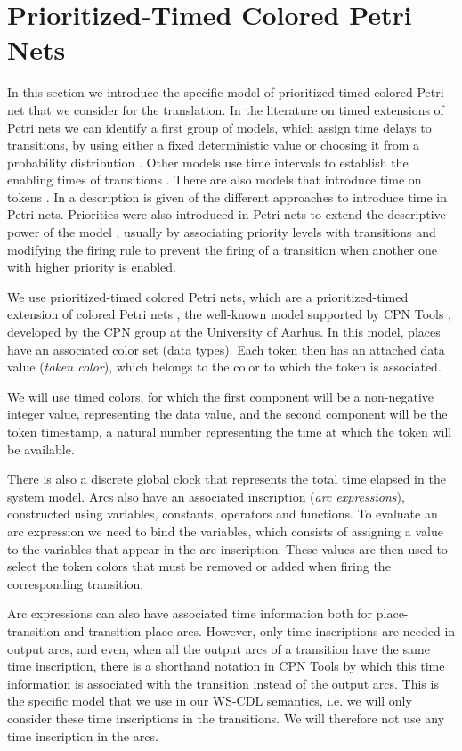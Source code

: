 \section{Prioritized-Timed Colored Petri Nets}\label{petrinet}

In this section we introduce the specific model of prioritized-timed
colored Petri net that we consider for the translation. 
In the
literature on timed extensions of Petri nets we can identify a
first group of models, which assign time delays to transitions,
by using either a fixed deterministic value
\cite{Ram73,Sif77,VFC93} or choosing it from a probability
distribution \cite{AjCh85}. Other models use time intervals to
establish the enabling times of transitions \cite{Mer74}. 
There are also models that introduce time on tokens
\cite{van93,van95,BLT90}. In \cite{Bow96,Wan98} 
a description is given of the different approaches 
to introduce time in Petri nets.
%
Priorities were also introduced in Petri nets to extend the descriptive 
power of the model \cite{Bau96,Best92,Pet81}, usually by
associating priority levels with transitions and modifying the firing
rule to prevent the firing of a transition when another one with
higher priority is enabled. 

We use prioritized-timed colored Petri nets, 
which are
a prioritized-timed extension of colored Petri nets \cite{Jensen97},
the well-known model supported by CPN Tools \cite{CPNTools},
developed by the CPN group at the University of Aarhus.
In this model, places have an associated color set (data types). 
Each token then  has  an attached data value
({\em token color}),
which belongs to the color to which the token is
associated. 

We will use timed colors, for which the first component
will be a non-negative integer value, representing the data value,
and the second component will be the token timestamp,
a natural number representing the time at which the 
token will be available.

There is also a discrete global clock that represents
the total time elapsed in the system model. Arcs also have 
an associated inscription ({\em arc expressions}),
constructed using variables, constants, operators
and functions. 
To evaluate an arc expression we need to
bind the variables, which consists of assigning
a value to the variables that appear in the
arc inscription. These values are then used to
select the token colors that must be removed or added when
firing the corresponding transition.

Arc expressions can also have associated time information
both for place-transition and transition-place arcs.
However, only time inscriptions are needed
in output arcs, and even, when all the output arcs
of a transition have the same time inscription,
there is a shorthand notation in CPN Tools
by which this time information is associated with
the transition instead of the output arcs.
This is the specific model that we use 
in our WS-CDL semantics, i.e. we will only
consider these time inscriptions in the transitions.
We will therefore not use any time inscription
in the arcs.

